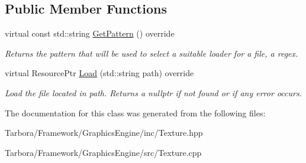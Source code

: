 \subsection*{Public Member Functions}
\begin{DoxyCompactItemize}
\item 
\mbox{\label{classTarbora_1_1TextureResourceLoader_a2fb7b4ab06d5da441474de18f7ef20ff}} 
virtual const std\+::string \hyperlink{classTarbora_1_1TextureResourceLoader_a2fb7b4ab06d5da441474de18f7ef20ff}{Get\+Pattern} () override
\begin{DoxyCompactList}\small\item\em Returns the pattern that will be used to select a suitable loader for a file, a regex. \end{DoxyCompactList}\item 
\mbox{\label{classTarbora_1_1TextureResourceLoader_a1ea8b00bc4fb5229471ab1aad613cc18}} 
virtual Resource\+Ptr \hyperlink{classTarbora_1_1TextureResourceLoader_a1ea8b00bc4fb5229471ab1aad613cc18}{Load} (std\+::string path) override
\begin{DoxyCompactList}\small\item\em Load the file located in {\itshape path}. Returns a nullptr if not found or if any error occurs. \end{DoxyCompactList}\end{DoxyCompactItemize}


The documentation for this class was generated from the following files\+:\begin{DoxyCompactItemize}
\item 
Tarbora/\+Framework/\+Graphics\+Engine/inc/Texture.\+hpp\item 
Tarbora/\+Framework/\+Graphics\+Engine/src/Texture.\+cpp\end{DoxyCompactItemize}
